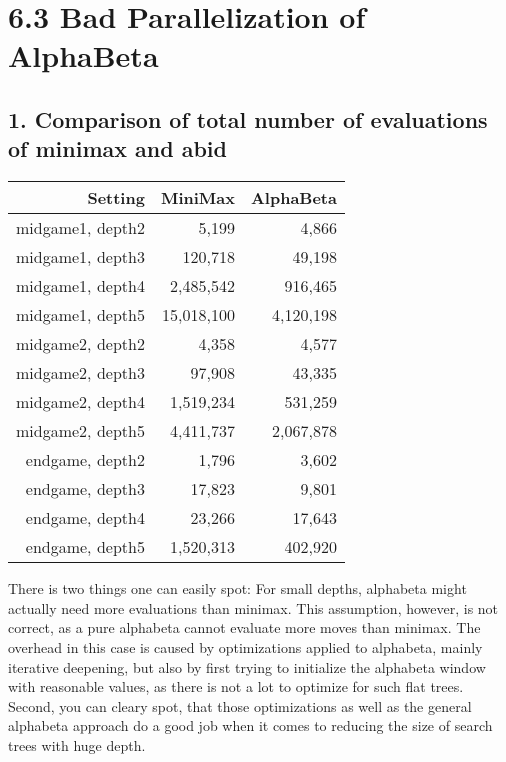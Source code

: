 \section*{6.3 Bad Parallelization of AlphaBeta}

\subsection*{1. Comparison of total number of evaluations of minimax and abid}


\begin{center}
  \begin{tabular}{|r|r|r|}
    \hline
    Setting & MiniMax & AlphaBeta \\ \hline
    midgame1, depth2 & 5,199 & 4,866 \\ \hline
    midgame1, depth3 & 120,718 & 49,198    \\ \hline
    midgame1, depth4 & 2,485,542 & 916,465    \\ \hline
    midgame1, depth5 & 15,018,100 & 4,120,198    \\ \hline
    midgame2, depth2 & 4,358 & 4,577 \\ \hline
    midgame2, depth3 & 97,908 & 43,335    \\ \hline
    midgame2, depth4 & 1,519,234 & 531,259   \\ \hline
    midgame2, depth5 & 4,411,737 & 2,067,878    \\ \hline
    endgame, depth2 & 1,796 & 3,602 \\ \hline
    endgame, depth3 & 17,823 & 9,801    \\ \hline
    endgame, depth4 & 23,266 & 17,643   \\ \hline
    endgame, depth5 & 1,520,313 & 402,920    \\ \hline
  \end{tabular}
\end{center}

There is two things one can easily spot: For small depths, alphabeta might actually need more evaluations than minimax. This assumption, however, is not correct, as a pure alphabeta cannot evaluate more moves than minimax. The overhead in this case is caused by optimizations applied to alphabeta, mainly iterative deepening, but also by first trying to initialize the alphabeta window with reasonable values, as there is not a lot to optimize for such flat trees. Second, you can cleary spot, that those optimizations as well as the general alphabeta approach do a good job when it comes to reducing the size of search trees with huge depth. 

